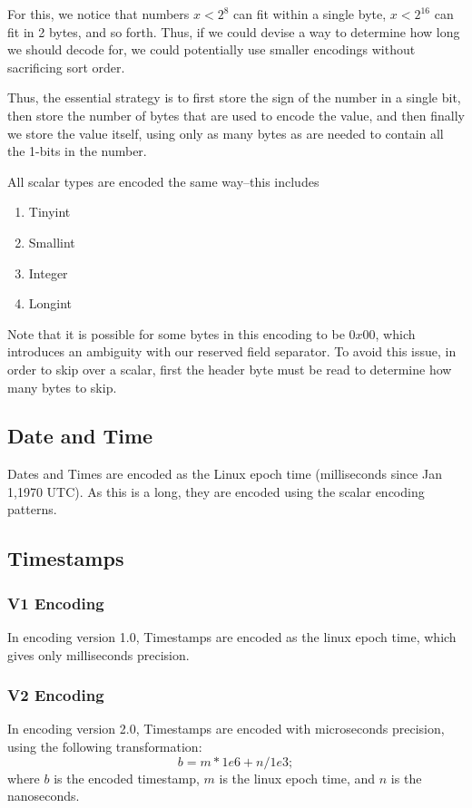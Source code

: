 For this, we notice that numbers $x < 2^8$ can fit within a single byte, $x<2^16$ can fit in 2 bytes, and so forth. Thus, if we could devise a way to determine how long we should decode for, we could potentially use smaller encodings without sacrificing sort order. 

Thus, the essential strategy is to first store the sign of the number in a single bit, then store the number of bytes that are used to encode the value, and then finally we store the value itself, using only as many bytes as are needed to contain all the 1-bits in the number.

All scalar types are encoded the same way--this includes

\begin{enumerate}
\item Tinyint
\item Smallint
\item Integer
\item Longint
\end{enumerate}

Note that it is possible for some bytes in this encoding to be $0x00$, which introduces an ambiguity with our reserved field separator. To avoid this issue, in order to skip over a scalar, first the header byte must be read to determine how many bytes to skip.

\subsection{Date and Time}
Dates and Times are encoded as the Linux epoch time (milliseconds since Jan 1,1970 UTC). As this is a long, they are encoded using the scalar encoding patterns.

\subsection{Timestamps}

\subsubsection{V1 Encoding}
In encoding version 1.0, Timestamps are encoded as the linux epoch time, which gives only milliseconds precision.

\subsubsection{V2 Encoding}
In encoding version 2.0, Timestamps are encoded with microseconds precision, using the following transformation:
\begin{displaymath}
b = m*1e6 + n/1e3;
\end{displaymath}
where $b$ is the encoded timestamp, $m$ is the linux epoch time, and $n$ is the nanoseconds. 

